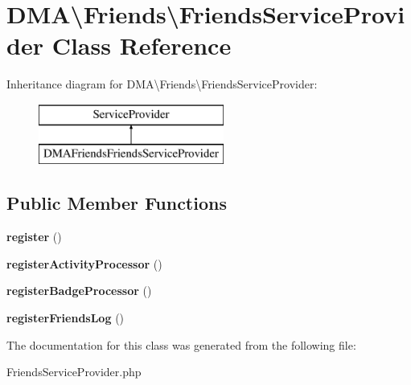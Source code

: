 \hypertarget{classDMA_1_1Friends_1_1FriendsServiceProvider}{\section{D\-M\-A\textbackslash{}Friends\textbackslash{}Friends\-Service\-Provider Class Reference}
\label{classDMA_1_1Friends_1_1FriendsServiceProvider}
}
Inheritance diagram for D\-M\-A\textbackslash{}Friends\textbackslash{}Friends\-Service\-Provider\-:\begin{figure}[H]
\begin{center}
\leavevmode
\includegraphics[height=2.000000cm]{classDMA_1_1Friends_1_1FriendsServiceProvider}
\end{center}
\end{figure}
\subsection*{Public Member Functions}
\begin{DoxyCompactItemize}
\item 
\hypertarget{classDMA_1_1Friends_1_1FriendsServiceProvider_a6a90d2cdc4c6b153b45764ba66e154ae}{{\bfseries register} ()}\label{classDMA_1_1Friends_1_1FriendsServiceProvider_a6a90d2cdc4c6b153b45764ba66e154ae}

\item 
\hypertarget{classDMA_1_1Friends_1_1FriendsServiceProvider_acac19246d5282897b8e0ce6265ed5ef3}{{\bfseries register\-Activity\-Processor} ()}\label{classDMA_1_1Friends_1_1FriendsServiceProvider_acac19246d5282897b8e0ce6265ed5ef3}

\item 
\hypertarget{classDMA_1_1Friends_1_1FriendsServiceProvider_a8c3cfb466bb9300f3909797a6b58b634}{{\bfseries register\-Badge\-Processor} ()}\label{classDMA_1_1Friends_1_1FriendsServiceProvider_a8c3cfb466bb9300f3909797a6b58b634}

\item 
\hypertarget{classDMA_1_1Friends_1_1FriendsServiceProvider_a2d6ff7101ca6389c00e298f2d594a1df}{{\bfseries register\-Friends\-Log} ()}\label{classDMA_1_1Friends_1_1FriendsServiceProvider_a2d6ff7101ca6389c00e298f2d594a1df}

\end{DoxyCompactItemize}


The documentation for this class was generated from the following file\-:\begin{DoxyCompactItemize}
\item 
Friends\-Service\-Provider.\-php\end{DoxyCompactItemize}
